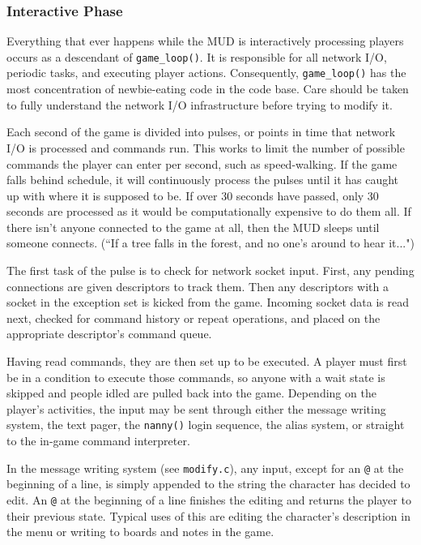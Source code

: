 \documentclass[11pt]{article}
\begin{document}
\subsubsection{Interactive Phase}
Everything that ever happens while the MUD is interactively processing players occurs as a descendant of \texttt{game\_loop()}. It is responsible for all network I/O, periodic tasks, and executing player actions.  Consequently, \texttt{game\_loop()} has the most concentration of newbie-eating code in the code base.  Care should be taken to fully understand the network I/O infrastructure before trying to modify it.
\par
Each second of the game is divided into pulses, or points in time that network I/O is processed and commands run.  This works to limit the number of possible commands the player can enter per second, such as speed-walking.  If the game falls behind schedule, it will continuously process the pulses until it has caught up with where it is supposed to be. If over 30 seconds have passed, only 30 seconds are processed as it would be computationally expensive to do them all.  If there isn't anyone connected to the game at all, then the MUD sleeps until someone connects. (``If a tree falls in the forest, and no one's around to hear it...")
\par
The first task of the pulse is to check for network socket input.  First, any pending connections are given descriptors to track them.  Then any descriptors with a socket in the exception set is kicked from the game. Incoming socket data is read next, checked for command history or repeat operations, and placed on the appropriate descriptor's command queue.
\par
Having read commands, they are then set up to be executed.  A player must first be in a condition to execute those commands, so anyone with a wait state is skipped and people idled are pulled back into the game.  Depending on the player's activities, the input may be sent through either the message writing system, the text pager, the \texttt{nanny()} login sequence, the alias system, or straight to the in-game command interpreter.
\par
In the message writing system (see \texttt{modify.c}), any input, except for an \texttt{@} at the beginning of a line, is simply appended to the string the character has decided to edit.  An \texttt{@} at the beginning of a line finishes the editing and returns the player to their previous state.  Typical uses of this are editing the character's description in the menu or writing to boards and notes in the game.
\end{document}

